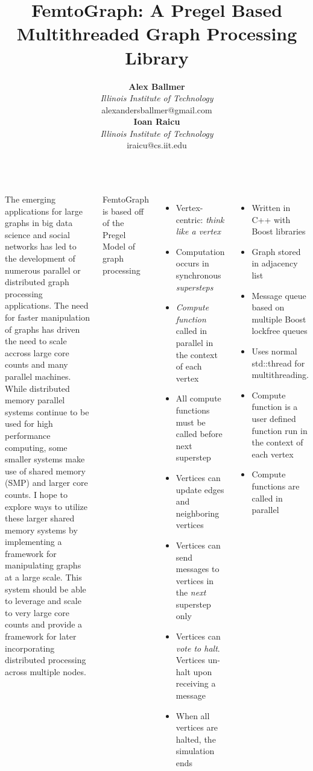 \documentclass[25pt, portrait,  margin=0mm, innermargin=15mm,
  blockverticalspace=15mm, colspace=15mm, subcolspace=8mm]{tikzposter}
\title{FemtoGraph: A Pregel Based Multithreaded
  Graph Processing Library}
\author{
  \textbf{Alex Ballmer}\\
  \textit{Illinois Institute of Technology}\\
  alexandersballmer@gmail.com\\
  \textbf{Ioan Raicu}\\
  \textit{Illinois Institute of Technology}\\
  iraicu@cs.iit.edu\\
}
\begin{document}
\maketitle

\begin{columns}
     {


  The emerging applications for large graphs in big data science and social networks has led to the development of numerous parallel or distributed graph processing applications. The need for faster manipulation of graphs has driven the need to scale accross large core counts and many parallel machines. While distributed memory parallel systems continue to be used for high performance computing, some smaller systems make use of shared memory (SMP) and larger core counts. I hope to explore ways to utilize these larger shared memory systems by implementing a framework for manipulating graphs at a large scale. This system should be able to leverage and scale to very large core counts and provide a framework for later incorporating distributed processing across multiple nodes.
}


     {
      FemtoGraph is based off of the Pregel Model of graph processing

      \begin{itemize}
      \item Vertex-centric: \textit{think like a vertex}
      \item Computation occurs in synchronous \textit{supersteps}
      \item \textit{Compute function} called in parallel in the context of each vertex
      \item All compute functions must be called before next superstep
      \item Vertices can update edges and neighboring vertices
      \item Vertices can send messages to vertices in the \textit{next} superstep only
      \item Vertices can \textit{vote to halt}. Vertices un-halt upon receiving a message
      \item When all vertices are halted, the simulation ends
      \end{itemize}
      
      }

     {

      \begin{itemize}
      \item Written in C++ with Boost libraries
      \item Graph stored in adjacency list
      \item Message queue based on multiple Boost lockfree queues
      \item Uses normal std::thread for multithreading.
      \item Compute function is a user defined function run in the context of each vertex
      \item Compute functions are called in parallel
      \end{itemize}


}
\end{columns}
\end{document}
